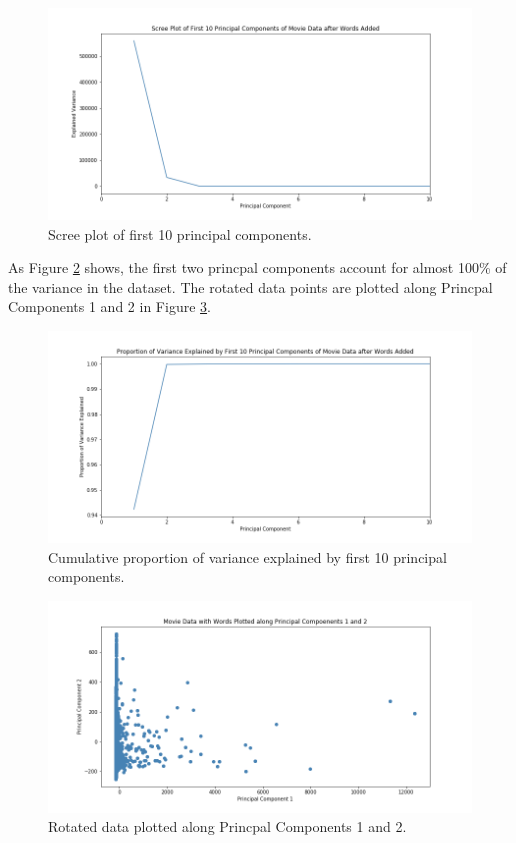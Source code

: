\documentclass[12pt, oneside]{article}   	%
\begin{document}
\begin{figure}%
\includegraphics[width=\textwidth]{scree_first_10}
\caption{\label{fig:scree_first_10}Scree plot of first 10 principal components.}
\end{figure}

As Figure \ref{fig:pca_var_explained} shows, the first two princpal components account for almost 100\% of the variance in the dataset. The rotated data points are plotted along Princpal Components 1 and 2 in Figure \ref{fig:pc1_pc2}.

\begin{figure}%
\includegraphics[width=\textwidth]{pca_var_explained}
\caption{\label{fig:pca_var_explained}Cumulative proportion of variance explained by first 10 principal components.}
\end{figure}

\begin{figure}%
\includegraphics[width=\textwidth]{pc1_pc2}
\caption{\label{fig:pc1_pc2}Rotated data plotted along Princpal Components 1 and 2.}
\end{figure}
\end{document}
